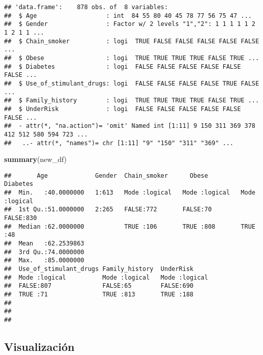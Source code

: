 \documentclass[
  10pt,
  spanish,
]{article}
\newenvironment{Shaded}{\begin{snugshade}}{\end{snugshade}}
\newcommand{\KeywordTok}[1]{\textcolor[rgb]{0.13,0.29,0.53}{\textbf{#1}}}
\newcommand{\NormalTok}[1]{#1}
\begin{document}
\begin{verbatim}
## 'data.frame':    878 obs. of  8 variables:
##  $ Age                   : int  84 55 80 40 45 78 77 56 75 47 ...
##  $ Gender                : Factor w/ 2 levels "1","2": 1 1 1 1 1 2 1 2 1 1 ...
##  $ Chain_smoker          : logi  TRUE FALSE FALSE FALSE FALSE FALSE ...
##  $ Obese                 : logi  TRUE TRUE TRUE TRUE FALSE TRUE ...
##  $ Diabetes              : logi  FALSE FALSE FALSE FALSE FALSE FALSE ...
##  $ Use_of_stimulant_drugs: logi  FALSE FALSE FALSE FALSE TRUE FALSE ...
##  $ Family_history        : logi  TRUE TRUE TRUE TRUE FALSE TRUE ...
##  $ UnderRisk             : logi  FALSE FALSE FALSE FALSE FALSE FALSE ...
##  - attr(*, "na.action")= 'omit' Named int [1:11] 9 150 311 369 378 412 512 580 594 723 ...
##   ..- attr(*, "names")= chr [1:11] "9" "150" "311" "369" ...
\end{verbatim}

\begin{Shaded}
\begin{Highlighting}[]
\KeywordTok{summary}\NormalTok{(new\_df)}
\end{Highlighting}
\end{Shaded}

\begin{verbatim}
##       Age             Gender  Chain_smoker      Obese          Diabetes      
##  Min.   :40.0000000   1:613   Mode :logical   Mode :logical   Mode :logical  
##  1st Qu.:51.0000000   2:265   FALSE:772       FALSE:70        FALSE:830      
##  Median :62.0000000           TRUE :106       TRUE :808       TRUE :48       
##  Mean   :62.2539863                                                          
##  3rd Qu.:74.0000000                                                          
##  Max.   :85.0000000                                                          
##  Use_of_stimulant_drugs Family_history  UnderRisk      
##  Mode :logical          Mode :logical   Mode :logical  
##  FALSE:807              FALSE:65        FALSE:690      
##  TRUE :71               TRUE :813       TRUE :188      
##                                                        
##                                                        
## 
\end{verbatim}

\hypertarget{visualizaciuxf3n}{%
\subsection{Visualización}\label{visualizaciuxf3n}}
\end{document}

